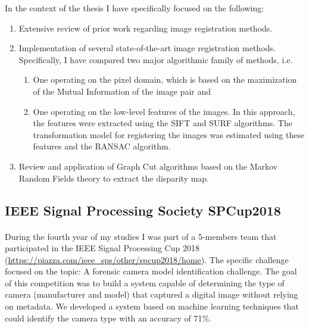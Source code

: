 \documentclass{article}
\begin{document}
In the context of the thesis I have specifically focused on the following:
\begin{enumerate}
    \item Extensive review of prior work regarding image registration methods.
    \item Implementation of several state-of-the-art image registration methods. Specifically, I have compared two major algorithmic family of methods, i.e.
    \begin{enumerate}
        \item One operating on the pixel domain, which is based on the maximization of the Mutual Information of the image pair and
        \item One operating on the low-level features of the images. In this approach, the features were extracted using the SIFT and SURF algorithms. The transformation model for registering the images was estimated using these features and the RANSAC algorithm.
    \end{enumerate}
    \item  Review and application of Graph Cut algorithms based on the Markov Random Fields theory to extract the disparity map.
\end{enumerate}

\subsection{IEEE Signal Processing Society SPCup2018}
\paragraph{}
During the fourth year of my studies I was part of a 5-members team that participated in the IEEE Signal Processing Cup 2018 (\url{https://piazza.com/ieee_sps/other/spcup2018/home}). The specific challenge focused on the topic: A forensic camera model identification challenge. The goal of this competition was to build a system capable of determining the type of camera (manufacturer and model) that captured a digital image without relying on metadata. We developed a system based on machine learning techniques that could identify the camera type with an accuracy of 71\%.



\end{document}
